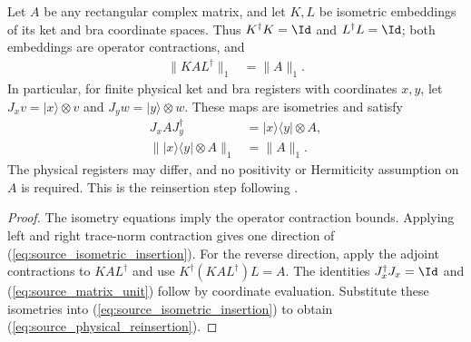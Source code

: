 \begin{theorem}
    \label{thm:source_physical_reinsertion}
    \leanok
    Let $A$ be any rectangular complex matrix, and let $K,L$ be
    isometric embeddings of its ket and bra coordinate spaces. Thus
    $K^\dagger K=\Id$ and $L^\dagger L=\Id$; both embeddings are operator
    contractions, and
    \begin{align}
        \lVert KAL^\dagger\rVert_1 & =\lVert A\rVert_1.
        \label{eq:source_isometric_insertion}
    \end{align}
    In particular, for finite physical ket and bra registers with
    coordinates $x,y$, let $J_xv=|x\rangle\otimes v$ and
    $J_yw=|y\rangle\otimes w$. These maps are isometries and satisfy
    \begin{align}
        J_xAJ_y^\dagger                            & =|x\rangle\langle y|\otimes A,
        \label{eq:source_matrix_unit}                                               \\
        \lVert|x\rangle\langle y|\otimes A\rVert_1 & =\lVert A\rVert_1.
        \label{eq:source_physical_reinsertion}
    \end{align}
    The physical registers may differ, and no positivity or Hermiticity
    assumption on $A$ is required.
    This is the reinsertion step following
    \cite[Equation~(5.18)]{OpenAI2026PolynomialPEPS}.
\end{theorem}

\begin{proof}\leanok
    The isometry equations imply the operator contraction bounds.
    Applying left and right trace-norm contraction gives one direction of
    (\ref{eq:source_isometric_insertion}). For the reverse direction,
    apply the adjoint contractions to $KAL^\dagger$ and use
    $K^\dagger(KAL^\dagger)L=A$.
    The identities $J_x^\dagger J_x=\Id$ and
    (\ref{eq:source_matrix_unit}) follow by coordinate evaluation.
    Substitute these isometries into (\ref{eq:source_isometric_insertion})
    to obtain (\ref{eq:source_physical_reinsertion}).
\end{proof}

